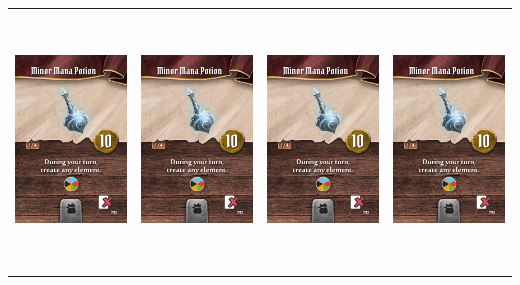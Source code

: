 \documentclass{minimal}
\begin{document}
{\begin{longtable}{llll}
\includegraphics[width=44mm,height=68mm]{./15-21/gh-020-minor-mana-potion.png} &
\includegraphics[width=44mm,height=68mm]{./15-21/gh-020-minor-mana-potion.png} &
\includegraphics[width=44mm,height=68mm]{./15-21/gh-020-minor-mana-potion.png} &
\includegraphics[width=44mm,height=68mm]{./15-21/gh-020-minor-mana-potion.png}\\ 

\end{longtable}}
\end{document}
